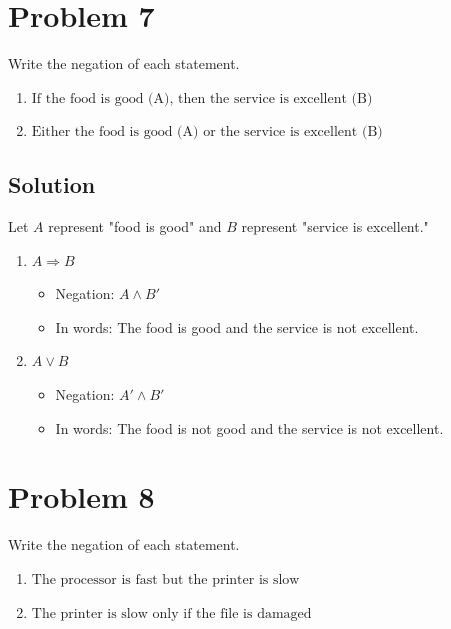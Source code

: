 \documentclass[12pt]{article}
\begin{document}
\newpage
\section*{Problem 7}
Write the negation of each statement.
\begin{enumerate}
    \item \( \text{If the food is good (A), then the service is excellent (B)} \)
    \item \( \text{Either the food is good (A) or the service is excellent (B)} \)
\end{enumerate}
\newpage
\subsection*{Solution}
Let \( A \) represent "food is good" and \( B \) represent "service is excellent."
\begin{enumerate}
    \item \( A \Rightarrow B \)
    \begin{itemize}
        \item Negation: \( A \land B' \)
        \item In words: The food is good and the service is not excellent.
    \end{itemize}
    
    \item \( A \lor B \)
    \begin{itemize}
        \item Negation: \( A' \land B' \)
        \item In words: The food is not good and the service is not excellent.
    \end{itemize}
\end{enumerate}

\newpage
\section*{Problem 8}
Write the negation of each statement.
\begin{enumerate}
    \item \( \text{The processor is fast but the printer is slow} \)
    \item \( \text{The printer is slow only if the file is damaged} \)
\end{enumerate}
\newpage
\end{document}
